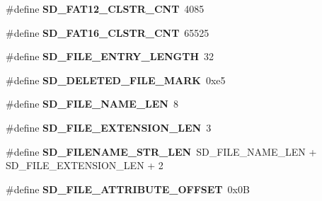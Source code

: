 \begin{DoxyCompactItemize}
\item 
\hypertarget{group__sd__private_gad63a7e9bc344e7e3ee3d60649d5065a1}{\#define {\bfseries \-S\-D\-\_\-\-F\-A\-T12\-\_\-\-C\-L\-S\-T\-R\-\_\-\-C\-N\-T}~4085}\label{group__sd__private_gad63a7e9bc344e7e3ee3d60649d5065a1}

\item 
\hypertarget{group__sd__private_gad10af43b5d782846d047f9d357fb8738}{\#define {\bfseries \-S\-D\-\_\-\-F\-A\-T16\-\_\-\-C\-L\-S\-T\-R\-\_\-\-C\-N\-T}~65525}\label{group__sd__private_gad10af43b5d782846d047f9d357fb8738}

\item 
\hypertarget{group__sd__private_gad7ecfe26f6539a06d5e415da2987486b}{\#define {\bfseries \-S\-D\-\_\-\-F\-I\-L\-E\-\_\-\-E\-N\-T\-R\-Y\-\_\-\-L\-E\-N\-G\-T\-H}~32}\label{group__sd__private_gad7ecfe26f6539a06d5e415da2987486b}

\item 
\hypertarget{group__sd__private_gafc4e1c013c3258a8aa1c399f7888d4fc}{\#define {\bfseries \-S\-D\-\_\-\-D\-E\-L\-E\-T\-E\-D\-\_\-\-F\-I\-L\-E\-\_\-\-M\-A\-R\-K}~0xe5}\label{group__sd__private_gafc4e1c013c3258a8aa1c399f7888d4fc}

\item 
\hypertarget{group__sd__private_ga33251d8af0a5234060b19b34e2dafd8e}{\#define {\bfseries \-S\-D\-\_\-\-F\-I\-L\-E\-\_\-\-N\-A\-M\-E\-\_\-\-L\-E\-N}~8}\label{group__sd__private_ga33251d8af0a5234060b19b34e2dafd8e}

\item 
\hypertarget{group__sd__private_ga0f1674fc10608ec2629c8d6b79cb8960}{\#define {\bfseries \-S\-D\-\_\-\-F\-I\-L\-E\-\_\-\-E\-X\-T\-E\-N\-S\-I\-O\-N\-\_\-\-L\-E\-N}~3}\label{group__sd__private_ga0f1674fc10608ec2629c8d6b79cb8960}

\item 
\hypertarget{group__sd__private_ga6ceb713f5e1a2aa4c479878f8e5de40b}{\#define {\bfseries \-S\-D\-\_\-\-F\-I\-L\-E\-N\-A\-M\-E\-\_\-\-S\-T\-R\-\_\-\-L\-E\-N}~\-S\-D\-\_\-\-F\-I\-L\-E\-\_\-\-N\-A\-M\-E\-\_\-\-L\-E\-N + \-S\-D\-\_\-\-F\-I\-L\-E\-\_\-\-E\-X\-T\-E\-N\-S\-I\-O\-N\-\_\-\-L\-E\-N + 2}\label{group__sd__private_ga6ceb713f5e1a2aa4c479878f8e5de40b}

\item 
\hypertarget{group__sd__private_ga6bea0e43e2d4f0438cc2012f19a7f9e0}{\#define {\bfseries \-S\-D\-\_\-\-F\-I\-L\-E\-\_\-\-A\-T\-T\-R\-I\-B\-U\-T\-E\-\_\-\-O\-F\-F\-S\-E\-T}~0x0\-B}\label{group__sd__private_ga6bea0e43e2d4f0438cc2012f19a7f9e0}


\end{DoxyCompactItemize}
